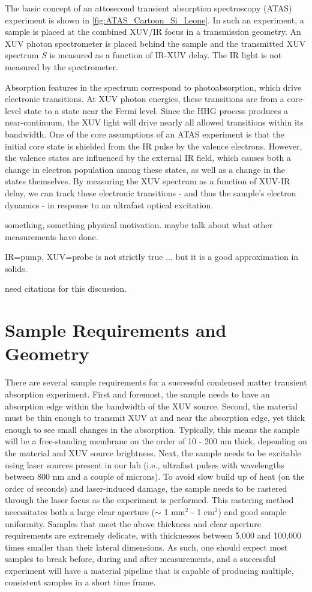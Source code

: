 The basic concept of an attosecond transient absorption spectroscopy (ATAS) experiment is shown in \cref{fig:ATAS_Cartoon_Si_Leone}. In such an experiment, a sample is placed at the combined XUV/IR focus in a transmission geometry. An XUV photon spectrometer is placed behind the sample and the transmitted XUV spectrum $S$ is measured as a function of IR-XUV delay. The IR light is not measured by the spectrometer.

Absorption features in the spectrum correspond to photoabsorption, which drive electronic transitions. At XUV photon energies, these transitions are from a core-level state to a state near the Fermi level. Since the HHG process produces a near-continuum, the XUV light will drive nearly all allowed transitions within its bandwidth. One of the core assumptions of an ATAS experiment is that the initial core state is shielded from the IR pulse by the valence electrons. However, the valence states are influenced by the external IR field, which causes both a change in electron population among these states, as well as a change in the states themselves. By measuring the XUV spectrum as a function of XUV-IR delay, we can track these electronic transitions - and thus the sample's electron dynamics - in response to an ultrafast optical excitation.

something, something physical motivation. maybe talk about what other measurements have done.

IR=pump, XUV=probe is not strictly true ... but it is a good approximation in solids.

need citations for this discussion.

\section{Sample Requirements and Geometry}

There are several sample requirements for a successful condensed matter transient absorption experiment. First and foremost, the sample needs to have an absorption edge within the bandwidth of the XUV source. Second, the material must be thin enough to transmit XUV at and near the absorption edge, yet thick enough to see small changes in the absorption. Typically, this means the sample will be a free-standing membrane on the order of 10 - 200 nm thick, depending on the material and XUV source brightness. Next, the sample needs to be excitable using laser sources present in our lab (i.e., ultrafast pulses with wavelengths between 800 nm and a couple of microns). To avoid slow build up of heat (on the order of seconds) and laser-induced damage, the sample needs to be rastered through the laser focus as the experiment is performed. This rastering method necessitates both a large clear aperture ($\sim$ 1 mm$^2$ - 1 cm$^2$) and good sample uniformity. Samples that meet the above thickness and clear aperture requirements are extremely delicate, with thicknesses between 5,000 and 100,000 times smaller than their lateral dimensions. As such, one should expect most samples to break before, during and after measurements, and a successful experiment will have a material pipeline that is capable of producing multiple, consistent samples in a short time frame.

